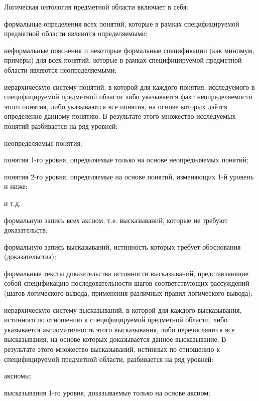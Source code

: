 Логическая онтология предметной области включает в себя:
\begin{textitemize}
	\item формальные определения всех понятий, которые в рамках специфицируемой предметной области являются определяемыми;
	\item неформальные пояснения и некоторые формальные спецификации (как минимум, примеры) для всех понятий, которые в рамках специфицируемой предметной области являются неопределяемыми;
	\item иерархическую систему понятий, в которой для каждого понятия, исследуемого в специфицируемой предметной области либо указывается факт неопределяемости этого понятия, либо указываются все понятия, на основе которых даётся определение данному понятию.
	В результате этого множество исследуемых понятий разбивается на ряд уровней: 
	\begin{textitemize}
		\item неопределяемые понятия;
		\item понятия 1-го уровня, определяемые только на основе неопределяемых понятий;
		\item понятия 2-го уровня, определяемые на основе понятий, изменяющих 1-й уровень и ниже;
		\item и т.д.
	\end{textitemize}
	\item формальную запись всех аксиом, т.е. высказываний, которые не требуют доказательств;
	\item формальную запись высказываний, истинность которых требует обоснования (доказательства);
	\item формальные тексты доказательства истинности высказываний, представляющие собой спецификацию последовательности шагов соответствующих рассуждений (шагов логического вывода, применения различных правил логического вывода);
	\item иерархическую систему высказываний, в которой для каждого высказывания, истинного по отношению к специфицируемой предметной области, либо указывается аксиоматичность этого высказывания, либо перечисляются \uline{все} высказывания, на основе которых доказывается данное высказывание. В результате этого множество высказываний, истинных по отношению к специфицируемой предметной области, разбивается на ряд уровней:
	\begin{textitemize}
		\item аксиомы;
		\item высказывания 1-го уровня, доказываемые только на основе аксиом;

\end{textitemize}
\end{textitemize}
